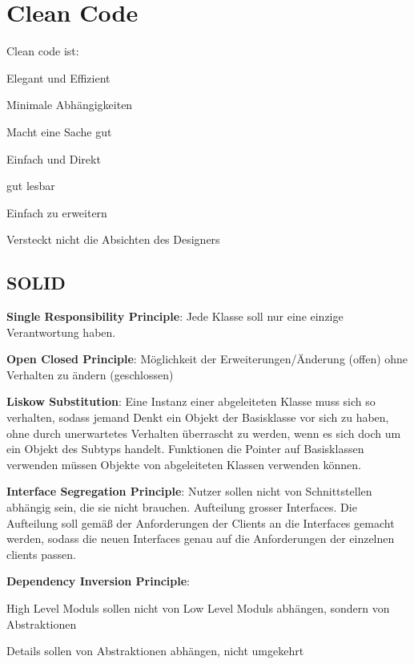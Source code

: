 \chapter{Clean Code}
Clean code ist:
\begin{inparaitem}
    \item Elegant und Effizient
    \item Minimale Abhängigkeiten
    \item Macht eine Sache gut
    \item Einfach und Direkt
    \item gut lesbar
    \item Einfach zu erweitern
    \item Versteckt nicht die Absichten des Designers
\end{inparaitem}

\section{SOLID}
\begin{compactenum}
    \item \textbf{Single Responsibility Principle}: Jede Klasse soll nur eine einzige Verantwortung haben.
    \item \textbf{Open Closed Principle}: Möglichkeit der Erweiterungen/Änderung (offen) ohne Verhalten
    zu ändern (geschlossen)
    \item \textbf{Liskow Substitution}: Eine Instanz einer abgeleiteten Klasse muss sich so verhalten, sodass
    jemand Denkt ein Objekt der Basisklasse vor sich zu haben, ohne durch unerwartetes Verhalten
    überrascht zu werden, wenn es sich doch um ein Objekt des Subtyps handelt. Funktionen die Pointer
    auf Basisklassen verwenden müssen Objekte von abgeleiteten Klassen verwenden können.
    \item \textbf{Interface Segregation Principle}: Nutzer sollen nicht von Schnittstellen abhängig sein,
    die sie nicht brauchen. Aufteilung grosser Interfaces. Die Aufteilung soll gemäß der Anforderungen
    der Clients an die Interfaces gemacht werden, sodass die neuen Interfaces genau auf die
    Anforderungen der einzelnen clients passen.
    \item \textbf{Dependency Inversion Principle}:
    \begin{compactitem}
        \item High Level Moduls sollen nicht von Low Level Moduls abhängen, sondern von Abstraktionen
        \item Details sollen von Abstraktionen abhängen, nicht umgekehrt
    \end{compactitem}
\end{compactenum}

